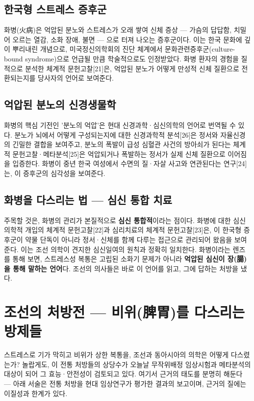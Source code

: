 \documentclass[11pt,oneside]{book}
\begin{document}
\subsection{한국형 스트레스 증후군}
화병(火病)은 억압된 분노와 스트레스가 오래 쌓여 신체 증상 — 가슴의 답답함, 치밀어 오르는 열감, 소화 장애, 불면 — 으로 터져 나오는 증후군이다. 이는 한국 문화에 깊이 뿌리내린 개념으로, 미국정신의학회의 진단 체계에서 문화관련증후군(culture-bound syndrome)으로 언급될 만큼 학술적으로도 인정받았다. 화병 환자의 경험을 질적으로 분석한 체계적 문헌고찰[21]은, 억압된 분노가 어떻게 만성적 신체 질환으로 전환되는지를 당사자의 언어로 보여준다.

\subsection{억압된 분노의 신경생물학}
화병의 핵심 기전인 '분노의 억압'은 현대 신경과학·심신의학의 언어로 번역될 수 있다. 분노가 뇌에서 어떻게 구성되는지에 대한 신경과학적 분석[26]은 정서와 자율신경의 긴밀한 결합을 보여주고, 분노의 폭발이 급성 심혈관 사건의 방아쇠가 된다는 체계적 문헌고찰·메타분석[25]은 억압되거나 폭발하는 정서가 실제 신체 질환으로 이어짐을 입증한다. 화병이 중년 한국 여성에서 수면의 질·자살 사고와 연관된다는 연구[24]는, 이 증후군의 심각성을 보여준다.

\subsection{화병을 다스리는 법 — 심신 통합 치료}
주목할 것은, 화병의 관리가 본질적으로 \textbf{심신 통합적}이라는 점이다. 화병에 대한 심신의학적 개입의 체계적 문헌고찰[22]과 심리치료의 체계적 문헌고찰[23]은, 이 한국형 증후군이 약물 단독이 아니라 정서·신체를 함께 다루는 접근으로 관리되어 왔음을 보여준다. 이는 조선 의학이 견지한 심신일여의 원칙과 정확히 일치한다. 화병이라는 렌즈를 통해 보면, 스트레스성 복통은 고립된 소화기 문제가 아니라 \textbf{억압된 심신이 장(腸)을 통해 말하는 언어}다. 조선의 의사들은 바로 이 언어를 읽고, 그에 답하는 처방을 냈다.

\section{조선의 처방전 — 비위(脾胃)를 다스리는 방제들}
스트레스로 기가 막히고 비위가 상한 복통을, 조선과 동아시아의 의학은 어떻게 다스렸는가? 놀랍게도, 이 전통 처방들의 상당수가 오늘날 무작위배정 임상시험과 메타분석의 대상이 되어 그 효능·안전성이 검토되고 있다. 여기서 근거의 태도를 분명히 해둔다 — 아래 서술은 전통 처방을 현대 임상연구가 평가한 결과의 보고이며, 근거의 질에는 이질성과 한계가 있다.
\end{document}
